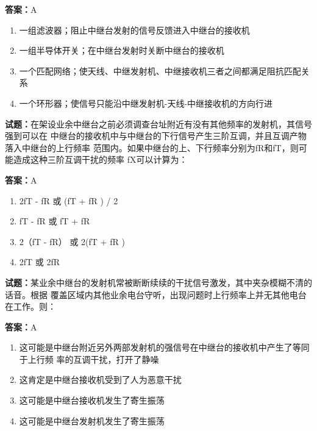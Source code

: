 \documentclass{ctexbook}
\begin{document}
\textbf{答案：}A 

\begin{enumerate}[leftmargin=3em]
  \item 一组滤波器；阻止中继台发射的信号反馈进入中继台的接收机 

  \item 一组半导体开关；在中继台发射时关断中继台的接收机 

  \item 一个匹配网络；使天线、中继发射机、中继接收机三者之间都满足阻抗匹配关系 

  \item 一个环形器；使信号只能沿中继发射机-天线-中继接收机的方向行进 

\end{enumerate}





\vspace{1em}

\textbf{试题：}在架设业余中继台之前必须调查台址附近有没有其他频率的发射机，其信号强到可以在
中继台的接收机中与中继台的下行信号产生三阶互调，并且互调产物落入中继台的上行频率
范围内。如果中继台的上、下行频率分别为fR和fT，则可能造成这种三阶互调干扰的频率
fX可以计算为： 

\textbf{答案：}A 

\begin{enumerate}[leftmargin=3em]
  \item 2fT - fR 或 (fT + fR ) / 2 

  \item fT - fR 或 fT + fR 

  \item 2（fT - fR） 或 2(fT + fR ) 

  \item 2fT 或 2fR 

\end{enumerate}






\vspace{1em}

\textbf{试题：}某业余中继台的发射机常被断断续续的干扰信号激发，其中夹杂模糊不清的话音。根据
覆盖区域内其他业余电台守听，出现问题时上行频率上并无其他电台在工作。则： 

\textbf{答案：}A 

\begin{enumerate}[leftmargin=3em]
  \item 这可能是中继台附近另外两部发射机的强信号在中继台的接收机中产生了等同于上行频
率的互调干扰，打开了静噪 

  \item 这肯定是中继台接收机受到了人为恶意干扰 

  \item 这可能是中继台接收机发生了寄生振荡 

  \item 这可能是中继台发射机发生了寄生振荡 

\end{enumerate}
\end{document}
